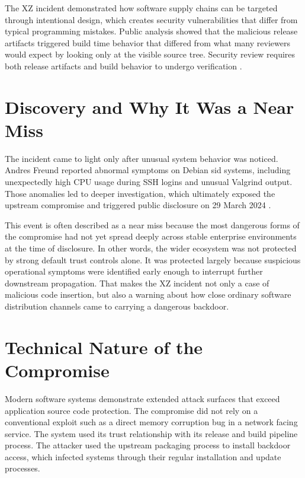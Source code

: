 The XZ incident demonstrated how software supply chains can be targeted through intentional design, which creates security vulnerabilities that differ from typical programming mistakes. Public analysis showed that the malicious release artifacts triggered build time behavior that differed from what many reviewers would expect by looking only at the visible source tree. Security review requires both release artifacts and build behavior to undergo verification \citep{nvd2024cve3094,redhat2024xz}.

\section{Discovery and Why It Was a Near Miss}

The incident came to light only after unusual system behavior was noticed. Andres Freund reported abnormal symptoms on Debian sid systems, including unexpectedly high CPU usage during SSH logins and unusual Valgrind output. Those anomalies led to deeper investigation, which ultimately exposed the upstream compromise and triggered public disclosure on 29 March 2024 \citep{freund2024xz}.

This event is often described as a near miss because the most dangerous forms of the compromise had not yet spread deeply across stable enterprise environments at the time of disclosure. In other words, the wider ecosystem was not protected by strong default trust controls alone. It was protected largely because suspicious operational symptoms were identified early enough to interrupt further downstream propagation. That makes the XZ incident not only a case of malicious code insertion, but also a warning about how close ordinary software distribution channels came to carrying a dangerous backdoor.

\section{Technical Nature of the Compromise}

Modern software systems demonstrate extended attack surfaces that exceed application source code protection. The compromise did not rely on a conventional exploit such as a direct memory corruption bug in a network facing service. The system used its trust relationship with its release and build pipeline process. The attacker used the upstream packaging process to install backdoor access, which infected systems through their regular installation and update processes.

